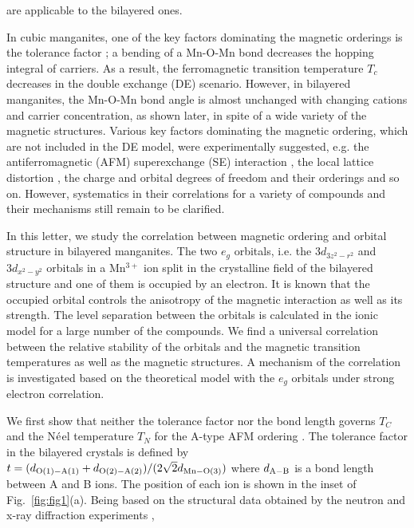 are applicable to the bilayered ones. 
%
\par
%
In cubic manganites,  
one of the key factors dominating the magnetic orderings 
is the tolerance factor \cite{hwang}; 
a bending of a Mn-O-Mn bond  
decreases the hopping integral of carriers.
As a result, 
the ferromagnetic transition temperature $T_c$ decreases 
in the double exchange (DE) scenario. 
However, in bilayered manganites, 
the Mn-O-Mn bond angle is 
almost unchanged with changing cations  
and carrier concentration, as shown later, 
in spite of a wide variety of the magnetic structures.   
%
Various key factors dominating the magnetic ordering, which 
are not included in the DE model, were experimentally suggested, 
e.g. the antiferromagnetic (AFM) superexchange (SE) interaction \cite{perring},  
the local lattice distortion \cite{louca,dessau,medarde,doloc},  
the charge and orbital degrees of freedom and their orderings 
\cite{moritomo2,kimura} and so on. 
However, systematics in their correlations for a variety of compounds 
and their mechanisms still remain to be clarified. 
%
\par
%
%
In this letter,  we study the 
correlation between magnetic ordering  
and orbital structure in bilayered manganites. 
The two $e_g$ orbitals, i.e. the $3d_{3z^2-r^2}$ and $3d_{x^2-y^2}$ orbitals  
in a Mn$^{3+}$ ion 
split in the crystalline field of the bilayered structure 
and one of them is occupied by an electron. 
%
It is known that the occupied orbital controls the anisotropy of the magnetic interaction 
as well as its strength. 
%
The level separation between  
the orbitals is calculated in the ionic model 
for a large number of the compounds.  
We find a universal correlation between the relative stability of the orbitals 
and the magnetic transition temperatures as well as the magnetic structures. 
A mechanism of the correlation is investigated based on the theoretical model 
with the $e_g$ orbitals under strong electron correlation. 
%
\par
We first show that 
neither the tolerance factor nor the bond length 
governs $T_{C}$ and the N$\rm \acute e$el temperature $T_N$ for the A-type AFM ordering \cite{aafm}.
The tolerance factor in the bilayered crystals is defined by  
$
t=(d_{\rm O(1)-A(1)}+d_{\rm O(2)-A(2)}) /  (2\sqrt{2} d_{\rm Mn-O(3)})
$ 
where $d_{\rm A-B}$ is a bond length between A and B ions.  
The position of each ion is shown in the inset of Fig.~\ref{fig:fig1}(a). 
Being based on the structural data obtained by the neutron and x-ray diffraction experiments
\cite{kubota,argyriou99,laffez,chi,argyriou97,akimoto,battle98,shen,battle96,seshadri,akimoto2,notice}, 
